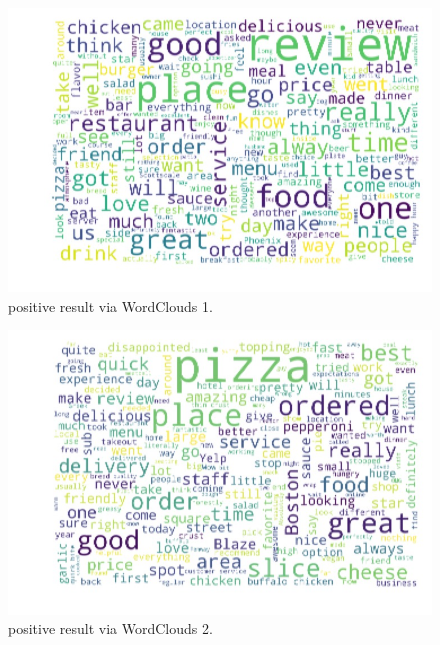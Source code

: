 \documentclass[a4paper]{article}
\begin{document}
\begin{figure}[htbp]
\centering
\includegraphics[width=1\textwidth]{Picture6.jpeg}
\caption{\label{fig:data}positive result via WordClouds 1. }
\end{figure}

\begin{figure}[htbp]
\centering
\includegraphics[width=1\textwidth]{Picture7.jpeg}
\caption{\label{fig:data} positive result via WordClouds 2. }
\end{figure}
\
\\
\\
\end{document}
